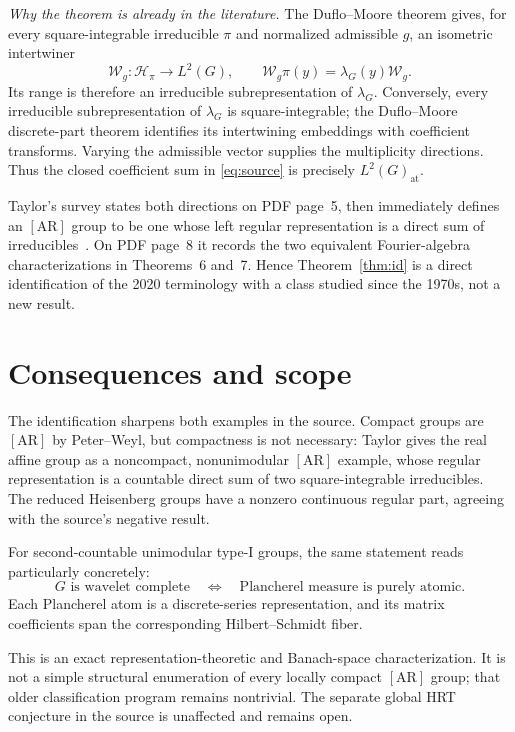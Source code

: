 \documentclass[11pt]{article}
\newcommand{\cH}{\mathcal H}
\newcommand{\cW}{\mathcal W}
\begin{document}
\emph{Why the theorem is already in the literature.}
The Duflo--Moore theorem gives, for every square-integrable irreducible $\pi$
and normalized admissible $g$, an isometric intertwiner
\[
 \cW_g:\cH_\pi\longrightarrow L^2(G),\qquad
 \cW_g\pi(y)=\lambda_G(y)\cW_g.
\]
Its range is therefore an irreducible subrepresentation of $\lambda_G$.
Conversely, every irreducible subrepresentation of $\lambda_G$ is
square-integrable; the Duflo--Moore discrete-part theorem identifies its
intertwining embeddings with coefficient transforms. Varying the admissible
vector supplies the multiplicity directions. Thus the closed coefficient sum
in \eqref{eq:source} is precisely $L^2(G)_{\mathrm{at}}$.

Taylor's survey states both directions on PDF page~5, then immediately defines
an $[\mathrm{AR}]$ group to be one whose left regular representation is a
direct sum of irreducibles~\cite{taylor}. On PDF page~8 it records the two
equivalent Fourier-algebra characterizations in Theorems~6 and~7. Hence
Theorem~\ref{thm:id} is a direct identification of the 2020 terminology with
a class studied since the 1970s, not a new result.

\section*{Consequences and scope}

The identification sharpens both examples in the source. Compact groups are
$[\mathrm{AR}]$ by Peter--Weyl, but compactness is not necessary: Taylor gives
the real affine group as a noncompact, nonunimodular $[\mathrm{AR}]$ example,
whose regular representation is a countable direct sum of two
square-integrable irreducibles. The reduced Heisenberg groups have a nonzero
continuous regular part, agreeing with the source's negative result.

For second-countable unimodular type-I groups, the same statement reads
particularly concretely:
\[
 G\text{ is wavelet complete}
 \quad\Longleftrightarrow\quad
 \text{Plancherel measure is purely atomic}.
\]
Each Plancherel atom is a discrete-series representation, and its matrix
coefficients span the corresponding Hilbert--Schmidt fiber.

This is an exact representation-theoretic and Banach-space characterization.
It is not a simple structural enumeration of every locally compact
$[\mathrm{AR}]$ group; that older classification program remains nontrivial.
The separate global HRT conjecture in the source is unaffected and remains
open.
\end{document}
